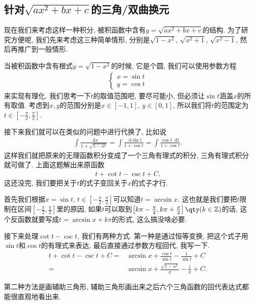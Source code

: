 \documentclass{ctexbook}
\newcommand*{\dif}{\mathop{}\!\mathrm{d}}
\begin{document}
{\subsection{针对$\sqrt{ax^{2}+bx+c}$的三角/双曲换元}
现在我们来考虑这样一种积分, 被积函数中含有$y=\sqrt{ax^{2}+bx+c}$的结构. 为了研究方便呢, 我们先来考虑这三种简单情形, 分别是$\sqrt{1-x^{2}},\,\sqrt{x^{2}+1},\,\sqrt{x^{2}-1}$, 然后再推广到一般情形. \par
当被积函数中含有根式$y=\sqrt{1-x^{2}}$的时候, 它是个圆, 我们可以使用参数方程
\begin{align*}
\begin{cases}
x=\sin{t}\\
y=\cos{t}
\end{cases}
\end{align*}
来实现有理化. 我们思考一下$t$的取值范围吧, 要尽可能小, 但必须让$\sin{t}$涵盖$x$的所有取值. 考虑到$x,y$的范围分别是$x\in\left[-1,1\right],\,y\in\left[0,1\right]$, 所以我们将$t$的范围定为$t\in\left[-\frac{\pi}{2},\frac{\pi}{2}\right]$. \par
接下来我们就可以在类似的问题中进行代换了, 比如说
\begin{align*}
\int\frac{\dif{x}}{1+\sqrt{1-x^{2}}}=\int\frac{\dif{\sin{t}}}{1+\cos{t}}=\int\frac{\cos{t}\dif{t}}{1+\cos{t}}
.\end{align*}
这样我们就把原来的无理函数积分变成了一个三角有理式的积分, 三角有理式积分就可做了. 上面这题解出来原函数
\begin{align*}
t+\cot{t}-\csc{t}+C
.\end{align*}
这还没完, 我们要把关于$t$的式子变回关于$x$的式子才行. \par
首先我们根据$x=\sin{t},\,t\in\left[-\frac{\pi}{2},\frac{\pi}{2}\right]$可以知道$t=\arcsin{x}$. 这也就是我们要把$t$限制在区间$\left[-\frac{\pi}{2},\frac{\pi}{2}\right]$里的原因, 如果$t$可以取到$\left[k\pi-\frac{\pi}{2},k\pi+\frac{\pi}{2}\right]\qty(k\in\mathbb{Z})$的话, 这个反函数就要写成$t=\arcsin{x}+k\pi$的形式, 这么搞没啥必要. \par
接下来处理$\cot{t}-\csc{t}$, 我们有两种方式. 第一种是通过恒等变换, 把这个式子用$\sin{t}$和$\cos{t}$的有理式来表达, 最后直接通过参数方程回代, 我写一下. 
\begin{align*}
t+\cot{t}-\csc{t}+C={}&\arcsin{x}+\frac{\cos{t}}{\sin{t}}-\frac{1}{\sin{t}}+C\\
={}&\arcsin{x}+\frac{\sqrt{1-x^{2}}}{x}-\frac{1}{x}+C
.\end{align*}\par
第二种方法是画辅助三角形, 辅助三角形画出来之后六个三角函数的回代表达式都能很直观地看出来. \\
}
\end{document}
